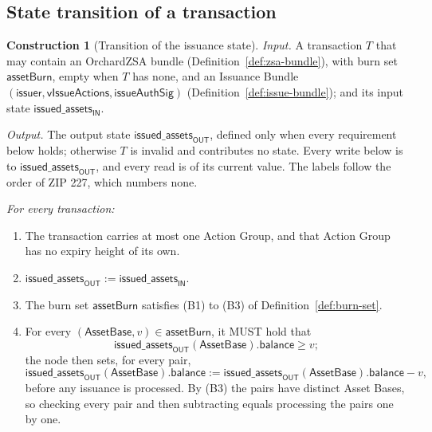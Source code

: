 \documentclass[11pt,a4paper]{article}
\theoremstyle{definition}
\newtheorem{construction}[theorem]{Construction}
\begin{document}
\subsection{State transition of a transaction}\label{sec:state-rules}

\begin{construction}[Transition of the issuance state]
\label{def:state-transition}
\emph{Input.} A transaction $T$ that may contain an OrchardZSA bundle
(Definition~\ref{def:zsa-bundle}), with burn set $\mathsf{assetBurn}$, empty
when $T$ has none, and an Issuance Bundle
$(\mathsf{issuer}, \mathsf{vIssueActions}, \mathsf{issueAuthSig})$
(Definition~\ref{def:issue-bundle}); and its input state
$\mathsf{issued\_assets}_{\mathsf{IN}}$.

\emph{Output.} The output state $\mathsf{issued\_assets}_{\mathsf{OUT}}$,
defined only when every requirement below holds; otherwise $T$ is invalid
and contributes no state. Every write below is to
$\mathsf{issued\_assets}_{\mathsf{OUT}}$, and every read is of its current
value. The labels follow the order of ZIP 227, which numbers none.

\emph{For every transaction:}
\begin{enumerate}[leftmargin=3.2em]
\item[(T1)] The transaction carries at most one Action Group, and that Action
  Group has no expiry height of its own.
\item[(T2)] $\mathsf{issued\_assets}_{\mathsf{OUT}} :=
  \mathsf{issued\_assets}_{\mathsf{IN}}$.
\item[(T3)] The burn set $\mathsf{assetBurn}$ satisfies (B1) to (B3) of
  Definition~\ref{def:burn-set}.
\item[(T4)] For every $(\mathsf{AssetBase}, v) \in \mathsf{assetBurn}$, it
  MUST hold that
  \[
    \mathsf{issued\_assets}_{\mathsf{OUT}}(\mathsf{AssetBase}).\mathsf{balance}
    \ge v;
  \]
  the node then sets, for every pair,
  \[
    \mathsf{issued\_assets}_{\mathsf{OUT}}(\mathsf{AssetBase}).\mathsf{balance}
    := \mathsf{issued\_assets}_{\mathsf{OUT}}(\mathsf{AssetBase}).
    \mathsf{balance} - v,
  \]
  before any issuance is processed. By (B3) the pairs have distinct Asset
  Bases, so checking every pair and then subtracting equals processing the
  pairs one by one.
\end{enumerate}


\end{construction}
\end{document}
